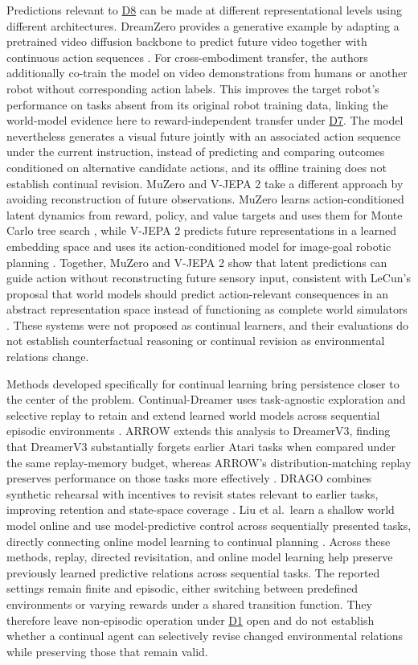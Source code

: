 \documentclass[10pt,journal,compsoc]{IEEEtran}
\DeclareRobustCommand{\Dref}[1]{\hyperref[sec:d#1]{D#1}}
\begin{document}
Predictions relevant to \Dref{8} can be made at different representational levels using different architectures.
DreamZero provides a generative example by adapting a pretrained video diffusion backbone to predict future video together with continuous action sequences \cite{ye2026}.
For cross-embodiment transfer, the authors additionally co-train the model on video demonstrations from humans or another robot without corresponding action labels.
This improves the target robot's performance on tasks absent from its original robot training data, linking the world-model evidence here to reward-independent transfer under \Dref{7}.
The model nevertheless generates a visual future jointly with an associated action sequence under the current instruction, instead of predicting and comparing outcomes conditioned on alternative candidate actions, and its offline training does not establish continual revision.
MuZero and V-JEPA 2 take a different approach by avoiding reconstruction of future observations.
MuZero learns action-conditioned latent dynamics from reward, policy, and value targets and uses them for Monte Carlo tree search \cite{schrittwieser2020}, while V-JEPA 2 predicts future representations in a learned embedding space and uses its action-conditioned model for image-goal robotic planning \cite{assran2025}.
Together, MuZero and V-JEPA 2 show that latent predictions can guide action without reconstructing future sensory input, consistent with LeCun's proposal that world models should predict action-relevant consequences in an abstract representation space instead of functioning as complete world simulators \cite{lecun2022}.
These systems were not proposed as continual learners, and their evaluations do not establish counterfactual reasoning or continual revision as environmental relations change.

Methods developed specifically for continual learning bring persistence closer to the center of the problem.
Continual-Dreamer uses task-agnostic exploration and selective replay to retain and extend learned world models across sequential episodic environments \cite{kessler2023}.
ARROW extends this analysis to DreamerV3, finding that DreamerV3 substantially forgets earlier Atari tasks when compared under the same replay-memory budget, whereas ARROW's distribution-matching replay preserves performance on those tasks more effectively \cite{alyahya2026}.
DRAGO combines synthetic rehearsal with incentives to revisit states relevant to earlier tasks, improving retention and state-space coverage \cite{fu2025}.
Liu et al.\ learn a shallow world model online and use model-predictive control across sequentially presented tasks, directly connecting online model learning to continual planning \cite{liu2025}.
Across these methods, replay, directed revisitation, and online model learning help preserve previously learned predictive relations across sequential tasks.
The reported settings remain finite and episodic, either switching between predefined environments or varying rewards under a shared transition function.
They therefore leave non-episodic operation under \Dref{1} open and do not establish whether a continual agent can selectively revise changed environmental relations while preserving those that remain valid.
\end{document}
